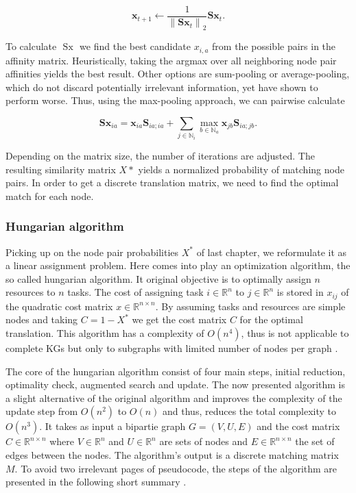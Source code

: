 {\begin{equation}
    \mathbf{x}_{t+1} \leftarrow \frac{1}{\left\|\mathbf{S} \mathbf{x}_{t}\right\|_{2}} \mathbf{S} \mathbf{x}_{t}.
\end{equation}

To calculate $\text { Sx }$ we find the best candidate $x_{i,a}$ from the possible pairs in the affinity matrix. Heuristically, taking the argmax over all neighboring node pair affinities yields the best result. Other options are sum-pooling or average-pooling, which do not discard potentially irrelevant information, yet have shown to perform worse. Thus, using the max-pooling approach, we can pairwise calculate

\begin{equation}
    \mathbf{Sx}_{i a}=\mathbf{x}_{i a} \mathbf{S}_{i a ; i a}+\sum_{j \in \mathbb{N}_{i}} \max _{b \in \mathbb{N}_{a}} \mathbf{x}_{j b} \mathbf{S}_{i a ; j b}.
\end{equation}

Depending on the matrix size, the number of iterations are adjusted. The resulting similarity matrix $X*$ yields a normalized probability of matching node pairs. In order to get a discrete translation matrix, we need to find the optimal match for each node.



\subsubsection{Hungarian algorithm}
\label{ssec3:hung}

Picking up on the node pair probabilities $X^*$ of last chapter, we reformulate it as a linear assignment problem. Here comes into play an optimization algorithm, the so called hungarian algorithm. It original objective is to optimally assign $n$ resources to $n$ tasks. The cost of assigning task $i \in \mathbb{R}^n$ to $j \in \mathbb{R}^n$ is stored in $x_{ij}$ of the quadratic cost matrix $x \in \mathbb{R}^{n \times n}$. By assuming tasks and resources are simple nodes and taking $C=1-X^*$ we get the cost matrix $C$ for the optimal translation. This algorithm has a complexity of $O\left(n^{4}\right)$, thus is not applicable to complete KGs but only to subgraphs with limited number of nodes per graph \cite{date_gpu-accelerated_2016}.

The core of the hungarian algorithm consist of four main steps, initial reduction, optimality check, augmented search and update. The now presented algorithm is a slight alternative of the original algorithm and improves the complexity of the update step from $O\left(n^{2}\right)$ to $O\left(n\right)$ and thus, reduces the total complexity to $O\left(n^{3}\right)$. It takes as input a bipartie graph $G=(V, U, E)$ and the cost matrix $C \in \mathbb{R}^{n \times n}$ where $V \in \mathbb{R}^n$ and $U \in \mathbb{R}^n$ are sets of nodes and $E \in \mathbb{R}^{n \times n}$ the set of edges between the nodes. The algorithm's output is a discrete matching matrix $M$. To avoid two irrelevant pages of pseudocode, the steps of the algorithm are presented in the following short summary \cite{mills-tettey_dynamic_nodate}.

}
